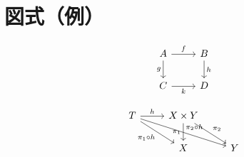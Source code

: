 \documentclass[12pt]{article}
\theoremstyle{definition}
\begin{document}
\section*{図式（例）}

\[
\begin{tikzcd}
A \arrow[r, "f"] \arrow[d, "g"'] & B \arrow[d, "h"] \\
C \arrow[r, "k"'] & D
\end{tikzcd}
\]



\[
\begin{tikzcd}
T \arrow[r, "h"] \arrow[dr, swap, "\pi_1\circ h"] \arrow[drr, "\pi_2\circ h"] & X\times Y \arrow[d, swap, "\pi_1"] \arrow[dr, "\pi_2"] \\
& X & Y
\end{tikzcd}
\]
\end{document}
